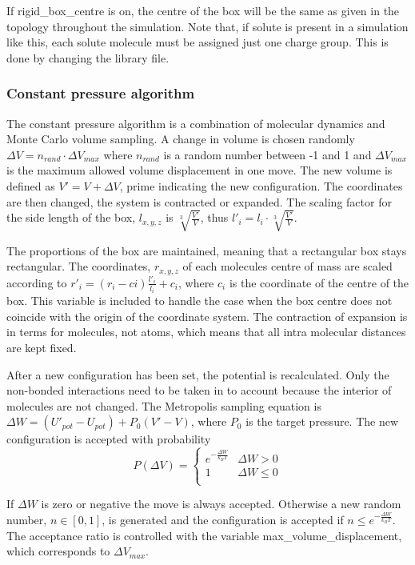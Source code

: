 \documentclass[a4paper,10pt]{article}
\begin{document}
If rigid\_box\_centre is on, the centre of the box will be the
same as given in the topology throughout the simulation. Note
that, if solute is present in a simulation like this, each solute
molecule must be assigned just one charge group. This is done by
changing the library file.

\subsubsection{Constant pressure algorithm}
The constant pressure algorithm is a combination of molecular
dynamics and Monte Carlo volume sampling. A change in volume is
chosen randomly $\Delta V = n_{rand}\cdot\Delta V_{max}$ where
$n_{rand}$ is a random number between -1 and 1 and $\Delta
V_{max}$ is the maximum allowed volume displacement in one move.
The new volume is defined as $V' = V + \Delta V$, prime indicating
the new configuration. The coordinates are then changed, the
system is contracted or expanded. The scaling factor for the side
length of the box, $l_{x,y,z}$ is $\sqrt[3]{\frac{V'}{V}}$, thus
$l'_{i}=l_{i}\cdot\sqrt[3]{\frac{V'}{V}}$.

The proportions of the box are maintained, meaning that a
rectangular box stays rectangular. The coordinates, $r_{x,y,z}$ of
each molecules centre of mass are scaled according to $r'_{i} =
(r_{i}-c{i})\frac{l'_{i}}{l_{i}}+c_{i}$, where $c_i$ is the
coordinate of the centre of the box. This variable is included to
handle the case when the box centre does not coincide with the
origin of the coordinate system. The contraction of expansion is
in terms for molecules, not atoms, which means that all intra
molecular distances are kept fixed.

After a new configuration has been set, the potential is
recalculated. Only the non-bonded interactions need to be taken in
to account because the interior of molecules are not changed. The
Metropolis sampling equation is $\Delta W = (U'_{pot} - U_{pot}) +
P_{0}(V'-V)$, where $P_0$ is the target pressure. The new
configuration is accepted with probability
\begin {equation}
 P(\Delta V) = \begin{cases}
    e^{-\frac{\Delta W}{k_{B}T}} & \Delta W > 0 \\
    1 & \Delta W \leq 0\\
  \end{cases}
\end{equation}

If $\Delta W$ is zero or negative the move is always accepted.
Otherwise a new random number, $n \in [0,1]$, is generated and the
configuration is accepted if $n \leq e^{-\frac{\Delta
W}{k_{B}T}}$. The acceptance ratio is controlled with the variable
max\_volume\_displacement, which corresponds to $\Delta V_{max}$.
\end{document}
